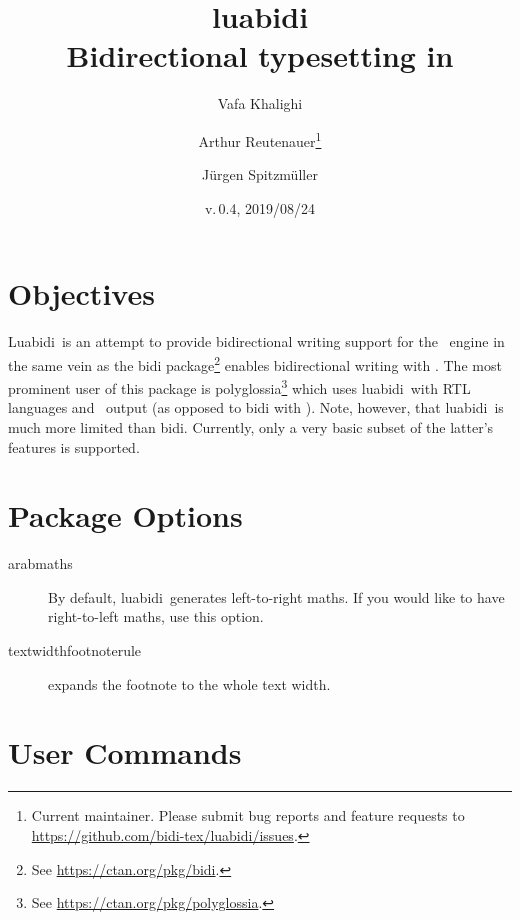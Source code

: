 \documentclass{article}
\newcommand*\lbd{\textsf{luabidi}}
\newcommand*\Lbd{\textsf{Luabidi}}
\def\fileversion{0.4}
\def\filedate{2019/08/24}
\begin{document}
	
\title{\lbd\\Bidirectional typesetting in \LuaTeX}

\date{v.\,\fileversion, \filedate}

\author{Vafa Khalighi \and Arthur Reutenauer\thanks{%
		Current maintainer. Please submit bug reports and feature requests to \protect\url{https://github.com/bidi-tex/luabidi/issues}.}
	    \and Jürgen Spitzmüller}

\maketitle

\section{Objectives}
\Lbd\ is an attempt to provide bidirectional writing support for the \LuaTeX\ engine in the same vein as the \textsf{bidi} package\footnote{%
See \url{https://ctan.org/pkg/bidi}.} enables bidirectional writing with \XeTeX. The most prominent user of this package is \textsf{polyglossia}\footnote{%
See \url{https://ctan.org/pkg/polyglossia}.} which uses \lbd\ with RTL languages and \LuaTeX\ output (as opposed to \textsf{bidi} with \XeTeX). Note, however, that \lbd\ is much more limited than \textsf{bidi}. Currently, only a very basic
subset of the latter's features is supported.

\section{Package Options}

\begin{description}
	\item[arabmaths] By default, \lbd\ generates left-to-right maths. If you would like to have right-to-left maths, use this option.
	\item[textwidthfootnoterule] expands the footnote to the whole text width.
\end{description}

\section{User Commands}
\end{document}
